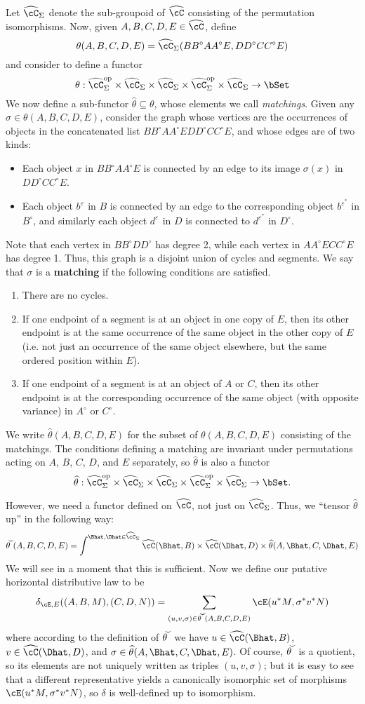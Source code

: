 \documentclass{amsart}
\newcommand{\C}{\cC}
\renewcommand{\Chat}{\ensuremath{\widehat{\C}}\xspace}
\newcommand{\Chats}{\ensuremath{\Chat_{\Sigma}}\xspace}
\newcommand{\thhat}{\ensuremath{\widehat{\theta}}\xspace}
\newcommand{\thchk}{\ensuremath{\widecheck{\theta}}\xspace}
\newcommand{\E}{\cE}
\renewcommand{\o}{^{\circ}}
\newcommand{\e}[1][]{^{\varepsilon_{#1}}}
\newcommand{\epbar}{^{\varepsilon^*}}
\begin{document}
Let $\Chats$ denote the sub-groupoid of \Chat consisting of the permutation isomorphisms.
Now, given $A,B,C,D,E\in\Chat$, define
\[ \theta(A,B,C,D,E) = \Chats(B B\o A A\o E, D D\o C C\o E) \]
and consider \theta to define a functor
\[ \theta : \Chats\op \times \Chats \times \Chats \times \Chats\op \times \Chats \to \bSet \]
We now define a sub-functor $\thhat \subseteq \theta$, whose elements we call \emph{matchings}.
Given any $\sigma\in\theta(A,B,C,D,E)$, consider the graph whose vertices are the occurrences of objects in the concatenated list $B B\o A A\o E D D\o C C\o E$, and whose edges are of two kinds:
\begin{itemize}
\item Each object $x$ in $B B\o A A\o E$ is connected by an edge to its image $\sigma(x)$ in $D D\o C C\o E$.
\item Each object $b\e$ in $B$ is connected by an edge to the corresponding object $b\epbar$ in $B\o$, and similarly each object $d\e$ in $D$ is connected to $d\epbar$ in $D\o$.
\end{itemize}
Note that each vertex in $B B\o D D\o$ has degree 2, while each vertex in $A A\o E C C\o E$ has degree 1.
Thus, this graph is a disjoint union of cycles and segments.
We say that $\sigma$ is a \textbf{matching} if the following conditions are satisfied.
\begin{enumerate}
\item There are no cycles.
\item If one endpoint of a segment is at an object in one copy of $E$, then its other endpoint is at the same occurrence of the same object in the other copy of $E$ (i.e. not just an occurrence of the same object elsewhere, but the same ordered position within $E$).
\item If one endpoint of a segment is at an object of $A$ or $C$, then its other endpoint is at the corresponding occurrence of the same object (with opposite variance) in $A\o$ or $C\o$.
\end{enumerate}
We write $\thhat(A,B,C,D,E)$ for the subset of $\theta(A,B,C,D,E)$ consisting of the matchings.
The conditions defining a matching are invariant under permutations acting on $A$, $B$, $C$, $D$, and $E$ separately, so $\thhat$ is also a functor
\[ \thhat : \Chats\op \times \Chats \times \Chats \times \Chats\op \times \Chats \to \bSet. \]

However, we need a functor defined on \Chat, not just on \Chats.
Thus, we ``tensor $\thhat$ up'' in the following way:
\[ \thchk(A,B,C,D,E) = \int^{\Bhat,\Dhat\in\Chats} \Chat(\Bhat,B) \times \Chat(\Dhat,D)\times \thhat(A,\Bhat,C,\Dhat,E) \]
We will see in a moment that this is sufficient.
Now we define our putative horizontal distributive law to be
\[ \delta_{\E,E}((A,B,M),(C,D,N)) = \sum_{(u,v,\sigma)\in \thchk(A,B,C,D,E)} \E(u^*M,\sigma^*v^*N) \]
where according to the definition of $\thchk$ we have $u\in \Chat(\Bhat,B)$, $v\in \Chat(\Dhat,D)$, and $\sigma\in\thhat(A,\Bhat,C,\Dhat,E)$.
Of course, \thchk is a quotient, so its elements are not uniquely written as triples $(u,v,\sigma)$; but it is easy to see that a different representative yields a canonically isomorphic set of morphisms $\E(u^*M,\sigma^*v^*N)$, so $\delta$ is well-defined up to isomorphism.
\end{document}
